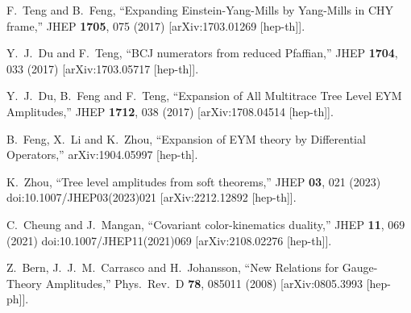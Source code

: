 \documentclass[11pt,a4paper]{article}
\begin{document}
\begin{thebibliography}{}
  F.~Teng and B.~Feng,
  ``Expanding Einstein-Yang-Mills by Yang-Mills in CHY frame,''
  JHEP {\bf 1705}, 075 (2017)
  [arXiv:1703.01269 [hep-th]].

  Y.~J.~Du and F.~Teng,
  ``BCJ numerators from reduced Pfaffian,''
  JHEP {\bf 1704}, 033 (2017)
  [arXiv:1703.05717 [hep-th]].


  Y.~J.~Du, B.~Feng and F.~Teng,
  ``Expansion of All Multitrace Tree Level EYM Amplitudes,''
  JHEP {\bf 1712}, 038 (2017)
  [arXiv:1708.04514 [hep-th]].

  B.~Feng, X.~Li and K.~Zhou,
  ``Expansion of EYM theory by Differential Operators,''
  arXiv:1904.05997 [hep-th].

K.~Zhou,
``Tree level amplitudes from soft theorems,''
JHEP \textbf{03}, 021 (2023)
doi:10.1007/JHEP03(2023)021
[arXiv:2212.12892 [hep-th]].


C.~Cheung and J.~Mangan,
``Covariant color-kinematics duality,''
JHEP \textbf{11}, 069 (2021)
doi:10.1007/JHEP11(2021)069
[arXiv:2108.02276 [hep-th]].


  Z.~Bern, J.~J.~M.~Carrasco and H.~Johansson,
  ``New Relations for Gauge-Theory Amplitudes,''
  Phys.\ Rev.\ D {\bf 78}, 085011 (2008)
  [arXiv:0805.3993 [hep-ph]].


\end{thebibliography}
\end{document}
